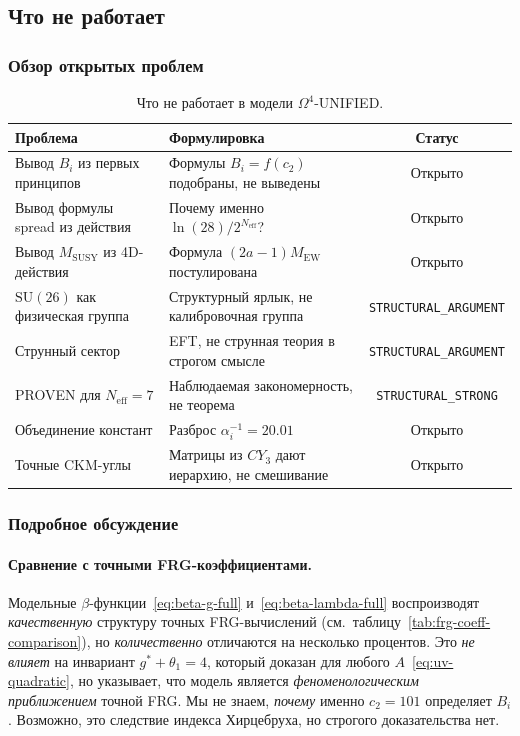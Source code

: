 \documentclass[11pt,a4paper]{article}
\newcommand{\SU}{\ensuremath{\mathrm{SU}}}
\newcommand{\CY}{\ensuremath{CY_3}}
\newcommand{\Om}{\ensuremath{\Omega^4}}
\theoremstyle{definition}
\begin{document}
\subsection{Что не работает}
\label{subsec:disc-fails}

\subsubsection{Обзор открытых проблем}

\begin{table}[ht]
\centering
\caption{Что не работает в модели \texorpdfstring{$\Om$}{}-UNIFIED.}
\label{tab:fails-disc}
\begin{tabular}{p{4.5cm}p{6cm}c}
\toprule
Проблема & Формулировка & Статус \\
\midrule
Вывод $B_i$ из первых принципов
    & Формулы $B_i = f(c_2)$ подобраны, не выведены
    & Открыто \\[0.3em]
Вывод формулы spread из действия
    & Почему именно $\ln(28)/2^{N_{\text{eff}}}$?
    & Открыто \\[0.3em]
Вывод $M_{\text{SUSY}}$ из 4D-действия
    & Формула $(2a-1) M_{\text{EW}}$ постулирована
    & Открыто \\[0.3em]
$\SU(26)$ как физическая группа
    & Структурный ярлык, не калибровочная группа
    & \texttt{STRUCTURAL\_ARGUMENT} \\[0.3em]
Струнный сектор
    & EFT, не струнная теория в строгом смысле
    & \texttt{STRUCTURAL\_ARGUMENT} \\[0.3em]
PROVEN для $N_{\text{eff}} = 7$
    & Наблюдаемая закономерность, не теорема
    & \texttt{STRUCTURAL\_STRONG} \\[0.3em]
Объединение констант
    & Разброс $\alpha_i^{-1} = 20.01$
    & Открыто \\[0.3em]
Точные CKM-углы
    & Матрицы из $\CY$ дают иерархию, не смешивание
    & Открыто \\
\bottomrule
\end{tabular}
\end{table}

\subsubsection{Подробное обсуждение}

\paragraph{Сравнение с точными FRG-коэффициентами.}
Модельные $\beta$-функции~\eqref{eq:beta-g-full}
и~\eqref{eq:beta-lambda-full} воспроизводят
\emph{качественную} структуру точных FRG-вычислений
(см.~таблицу~\ref{tab:frg-coeff-comparison}), но
\emph{количественно} отличаются на несколько процентов.
Это \emph{не влияет} на инвариант $g^* + \theta_1 = 4$,
который доказан для любого $A$~\eqref{eq:uv-quadratic},
но указывает, что модель является \emph{феноменологическим
приближением} точной FRG.
Мы не знаем, \emph{почему} именно $c_2 = 101$ определяет $B_i$.
Возможно, это следствие индекса Хирцебруха, но строгого
доказательства нет.
\end{document}
